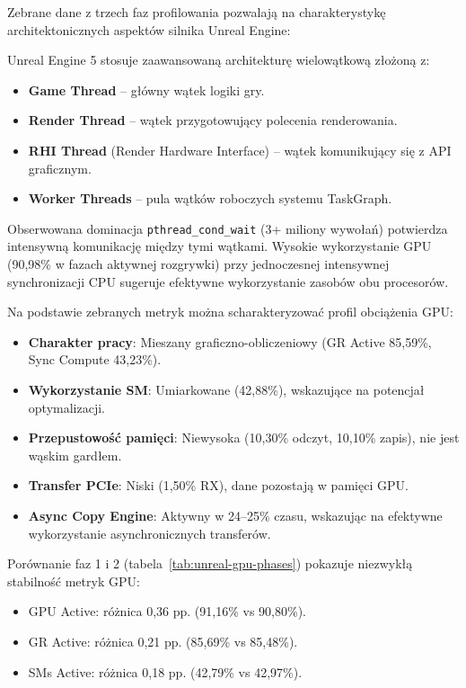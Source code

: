 Zebrane dane z trzech faz profilowania pozwalają na charakterystykę architektonicznych aspektów silnika Unreal Engine:


Unreal Engine 5 stosuje zaawansowaną architekturę wielowątkową złożoną z:
\begin{itemize}
    \item \textbf{Game Thread} -- główny wątek logiki gry.
    \item \textbf{Render Thread} -- wątek przygotowujący polecenia renderowania.
    \item \textbf{RHI Thread} (Render Hardware Interface) -- wątek komunikujący się z API graficznym.
    \item \textbf{Worker Threads} -- pula wątków roboczych systemu TaskGraph.
\end{itemize}

Obserwowana dominacja \texttt{pthread\_cond\_wait} (3+ miliony wywołań) potwierdza intensywną 
komunikację między tymi wątkami. 
Wysokie wykorzystanie 
GPU (90,98\% w fazach aktywnej rozgrywki) przy jednoczesnej intensywnej synchronizacji CPU sugeruje efektywne wykorzystanie zasobów obu procesorów.


Na podstawie zebranych metryk można scharakteryzować profil obciążenia GPU:
\begin{itemize}
    \item \textbf{Charakter pracy}: Mieszany graficzno-obliczeniowy (GR Active 85,59\%, Sync Compute 43,23\%).
    \item \textbf{Wykorzystanie SM}: Umiarkowane (42,88\%), wskazujące na potencjał optymalizacji.
    \item \textbf{Przepustowość pamięci}: Niewysoka (10,30\% odczyt, 10,10\% zapis), nie jest wąskim gardłem.
    \item \textbf{Transfer PCIe}: Niski (1,50\% RX), dane pozostają w pamięci GPU.
    \item \textbf{Async Copy Engine}: Aktywny w 24--25\% czasu, wskazując na efektywne wykorzystanie asynchronicznych transferów.
\end{itemize}


Porównanie faz 1 i 2 (tabela~\ref{tab:unreal-gpu-phases}) pokazuje niezwykłą stabilność metryk GPU:
\begin{itemize}
    \item GPU Active: różnica 0,36 pp. (91,16\% vs 90,80\%).
    \item GR Active: różnica 0,21 pp. (85,69\% vs 85,48\%).
    \item SMs Active: różnica 0,18 pp. (42,79\% vs 42,97\%).
\end{itemize}

